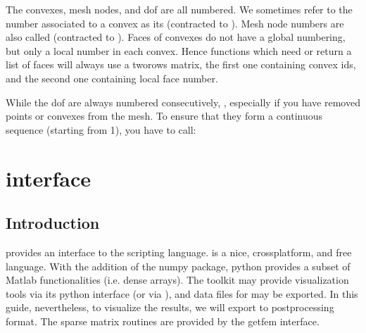 \documentclass[a4paper,11pt,english]{sphinxmanual}
\begin{document}
The convexes, mesh nodes, and dof are all numbered. We sometimes refer to the
number associated to a convex as its  (contracted to
). Mesh node numbers are also called  (contracted
to ). Faces of convexes do not have a global numbering, but only a
local number in each convex. Hence functions which need or return a list of faces
will always use a two\sphinxhyphen{}rows matrix, the first one containing convex ids, and the
second one containing local face number.

While the dof are always numbered consecutively, , especially if you have removed points or convexes from
the mesh. To ensure that they form a continuous sequence (starting from 1), you
have to call:

\begin{sphinxVerbatim}[commandchars=\\\{\}]
\end{sphinxVerbatim}


\chapter{  interface}
\label{\detokenize{python/pygf:py-gf-interface}}\label{\detokenize{python/pygf::doc}}

\section{Introduction}
\label{\detokenize{python/pygf:introduction}}
 provides an interface to the  scripting language.  is a nice,
cross\sphinxhyphen{}platform, and free language. With the addition of the numpy package,
python provides a subset of Matlab functionalities (i.e. dense arrays). The
 toolkit may provide visualization tools via its python interface (or
via ), and data files for   may be exported. In this guide,
nevertheless, to visualize the results, we will export to 
post\sphinxhyphen{}processing format. The sparse matrix routines are provided by the getfem
interface.
\end{document}
